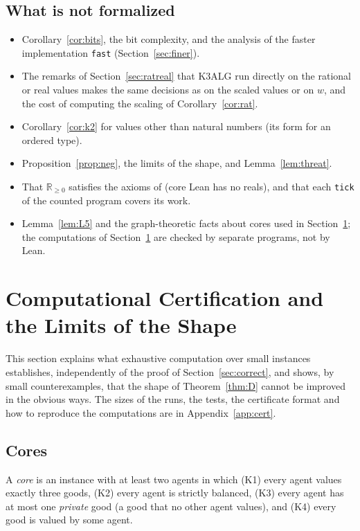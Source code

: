\documentclass[runningheads,11pt]{llncs}
\begin{document}
\subsection{What is not formalized}\label{sec:notformal}

\begin{itemize}
\item Corollary~\ref{cor:bits}, the bit complexity, and the analysis of the faster implementation \texttt{fast} (Section~\ref{sec:finer}).
\item The remarks of Section~\ref{sec:ratreal} that K3ALG run directly on the rational or real values makes the same decisions as on the scaled values or on $w$, and the cost of computing the scaling of Corollary~\ref{cor:rat}.
\item Corollary~\ref{cor:k2} for values other than natural numbers (its form for an ordered type).
\item Proposition~\ref{prop:neg}, the limits of the shape, and Lemma~\ref{lem:threat}.
\item That $\mathbb{R}_{\ge0}$ satisfies the axioms of  (core Lean has no reals), and that each \texttt{tick} of the counted program covers its work.
\item Lemma~\ref{lem:L5} and the graph-theoretic facts about cores used in Section~\ref{sec:cert}; the computations of Section~\ref{sec:cert} are checked by separate programs, not by Lean.
\end{itemize}

\section{Computational Certification and the Limits of the Shape}\label{sec:cert}

This section explains what exhaustive computation over small instances establishes, independently of the proof of Section~\ref{sec:correct}, and shows, by small counterexamples, that the shape of Theorem~\ref{thm:D} cannot be improved in the obvious ways. The sizes of the runs, the tests, the certificate format and how to reproduce the computations are in Appendix~\ref{app:cert}.

\subsection{Cores}\label{sec:cores}

\begin{definition}[core]\label{def:core}
A \emph{core} is an instance with at least two agents in which (K1) every agent values exactly three goods, (K2) every agent is strictly balanced, (K3) every agent has at most one \emph{private} good (a good that no other agent values), and (K4) every good is valued by some agent.
\end{definition}
\end{document}
